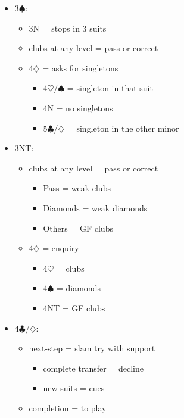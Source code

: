 \documentclass[a4paper,14pt]{extarticle}
\begin{document}
\begin{itemize}
\newpage

\item 3$\spadesuit$:
	\begin{itemize}
	\item 3N = stops in 3 suits
	\item clubs at any level = pass or correct
	\item 4$\diamondsuit$ = asks for singletons
		\begin{itemize}
		\item 4$\heartsuit$/$\spadesuit$ = singleton in that suit
		\item 4N = no singletons
		\item 5$\clubsuit$/$\diamondsuit$ = singleton in the other minor
		\end{itemize}
	\end{itemize}

\item 3NT:
	\begin{itemize}
	\item clubs at any level = pass or correct
		\begin{itemize}
		\item Pass = weak clubs
		\item Diamonds = weak diamonds
		\item Others = GF clubs
		\end{itemize}
	\item 4$\diamondsuit$ = enquiry
		\begin{itemize}
		\item 4$\heartsuit$ = clubs
		\item 4$\spadesuit$ = diamonds
		\item 4NT = GF clubs
		\end{itemize}
	\end{itemize}

\item 4$\clubsuit$/$\diamondsuit$:
	\begin{itemize}
	\item next-step = slam try with support
		\begin{itemize}
		\item complete transfer = decline
		\item new suits = cues
		\end{itemize}
	\item completion = to play
	\end{itemize}


\end{itemize}
\end{document}
